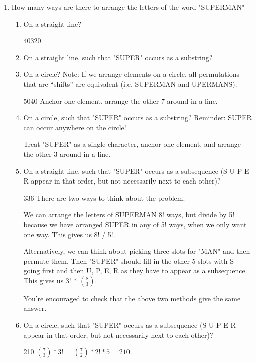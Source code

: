 \documentclass[11pt,preview]{standalone} %
\begin{document}
\begin{enumerate}
\item How many ways are there to arrange the letters of the word "SUPERMAN"
\begin{enumerate}
\item  On a straight line? 
\begin{Freeform}{40320}
\end{Freeform}

\item On a straight line, such that "SUPER" occurs as a substring?
\begin{Freeform}{24}
\end{Freeform}

\item On a circle? Note: If we arrange elements on a circle, all permutations that are ``shifts'' are equivalent (i.e. SUPERMAN and UPERMANS).
\begin{Freeform}{5040}
\Solution Anchor one element, arrange the other 7 around in a line.
\end{Freeform}

\item On a circle, such that "SUPER" occurs as a substring? Reminder: SUPER can occur anywhere on the circle!
\begin{Freeform}{6}
\Solution Treat "SUPER" as a single character, anchor one element, and arrange the other 3 around in 
a line.
\end{Freeform}

\item On a straight line, such that "SUPER" occurs as a subsequence 
(S U P E R appear in that order, but not necessarily next to each other)? 
\begin{Freeform}{336}
\Solution There are two ways to think about the problem.

We can arrange the letters of SUPERMAN 8! ways, but 
divide by 5! because we have arranged SUPER in any of 5! ways, when 
we only want one way. This gives us 8! / 5!.

Alternatively, we can think about picking three slots for "MAN" and then permute them. Then "SUPER" should fill in the other 5 slots with S going first and then U, P, E, R as they have to appear as a subsequence. This gives us 3! * ${8 \choose 3}$.

You're encouraged to check that the above two methods give the same answer. 
\end{Freeform}

\item On a circle, such that "SUPER" occurs as a subsequence (S U P E R 
appear in that order, but not necessarily next to each other)? 
\begin{Freeform}{210}
 \Solution ${7 \choose 3} * 3!$ = ${7 \choose 2} * 2! * 5= 210$. 


\end{Freeform}
\end{enumerate}
\end{enumerate}
\end{document}
